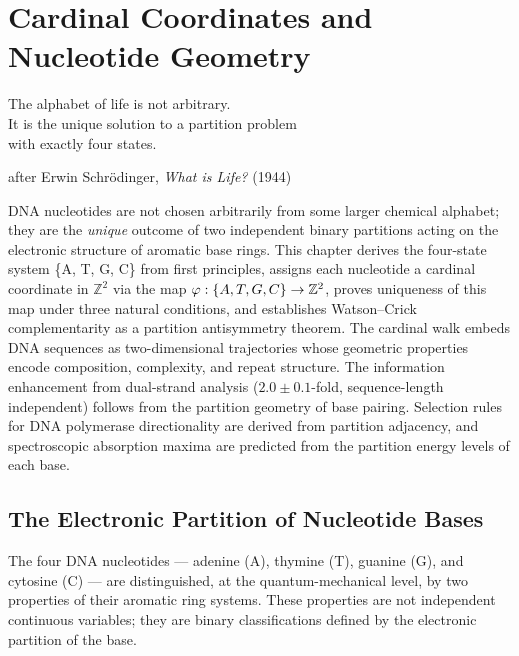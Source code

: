 
\chapter{Cardinal Coordinates and Nucleotide Geometry}
\label{chap:cardinal_coordinates}

\epigraph{%
  The alphabet of life is not arbitrary.\\
  It is the unique solution to a partition problem\\
  with exactly four states.%
}{after Erwin Schr\"odinger, \textit{What is Life?} (1944)}

\begin{chapterbox}
DNA nucleotides are not chosen arbitrarily from some larger chemical
alphabet; they are the \emph{unique} outcome of two independent binary
partitions acting on the electronic structure of aromatic base rings.
This chapter derives the four-state system \{A, T, G, C\} from first
principles, assigns each nucleotide a cardinal coordinate in $\mathbb{Z}^2$
via the map $\varphi: \{A,T,G,C\} \to \mathbb{Z}^2$, proves uniqueness
of this map under three natural conditions, and establishes Watson--Crick
complementarity as a partition antisymmetry theorem. The cardinal walk
embeds DNA sequences as two-dimensional trajectories whose geometric
properties encode composition, complexity, and repeat structure. The
information enhancement from dual-strand analysis ($2.0 \pm 0.1$-fold,
sequence-length independent) follows from the partition geometry of base
pairing. Selection rules for DNA polymerase directionality are derived
from partition adjacency, and spectroscopic absorption maxima are
predicted from the partition energy levels of each base.
\end{chapterbox}

\section{The Electronic Partition of Nucleotide Bases}
\label{sec:nucleotide_partition}

The four DNA nucleotides --- adenine (A), thymine (T), guanine (G), and
cytosine (C) --- are distinguished, at the quantum-mechanical level, by two
properties of their aromatic ring systems. These properties are not independent
continuous variables; they are binary classifications defined by the
electronic partition of the base.

